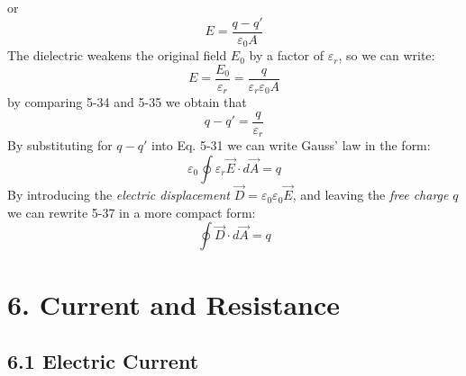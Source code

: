 \documentclass[12pt, a4paper]{article}
\begin{document}
		or
		\[
			E = \frac{q - q'}{\varepsilon_0 A}
			\tag{5-34}
		\]
		The dielectric weakens the original field $E_0$ by a factor of $\varepsilon_r$, so we can write:
		\[
			E = \frac{E_0}{\varepsilon_r} = \frac{q}{\varepsilon_r \varepsilon_0 A}
			\tag{5-35}
		\]
		by comparing 5-34 and 5-35 we obtain that
		\[
			q - q' = \frac{q}{\varepsilon_r}
			\tag{5-36}
		\]
		By substituting for $q - q'$ into Eq. 5-31 we can write Gauss' law in the form:
		\begin{equation*}
			\varepsilon_0 \oint \varepsilon_r \vec{E} \cdot d\vec{A} = q
			\tag{Gauss' Law with Dielectric, 5-37}
		\end{equation*}
		By introducing the \textit{electric displacement} 
		$\vec{D} = \varepsilon_0 \varepsilon_0 \vec{E}$, and leaving the \textit{free charge} $q$ we can rewrite 5-37 in a more compact form:
		\[
			\oint \vec{D} \cdot d\vec{A} = q
			\tag{Gauss' Law with Dielectric, 5-38}
		\]
		
		
		\newpage
		
		
		\section*{6. Current and Resistance}
		
		
		\subsection*{6.1 Electric Current}
		
\end{document}
